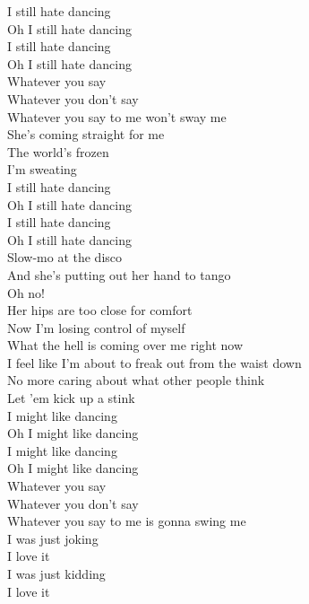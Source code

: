 
I still hate dancing \\
Oh I still hate dancing \\
I still hate dancing \\
Oh I still hate dancing \\

Whatever you say \\
Whatever you don't say \\
Whatever you say to me won't sway me \\

She's coming straight for me \\
The world's frozen \\
I'm sweating \\

I still hate dancing \\
Oh I still hate dancing \\
I still hate dancing \\
Oh I still hate dancing \\

Slow-mo at the disco \\
And she's putting out her hand to tango \\
Oh no! \\
Her hips are too close for comfort \\
Now I'm losing control of myself \\
What the hell is coming over me right now \\
I feel like I'm about to freak out from the waist down \\
No more caring about what other people think \\
Let 'em kick up a stink \\

I might like dancing \\
Oh I might like dancing \\
I might like dancing \\
Oh I might like dancing \\

Whatever you say \\
Whatever you don't say \\
Whatever you say to me is gonna swing me \\

I was just joking \\
I love it \\
I was just kidding \\
I love it \\

